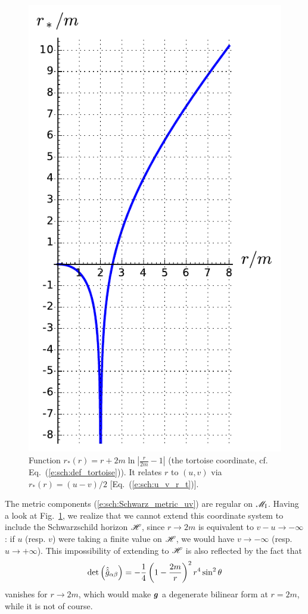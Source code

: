 \begin{figure}
\centerline{\includegraphics[height=0.4\textheight]{max_tortoise.pdf}}
\caption[]{\label{f:sch:tortoise} \footnotesize
Function $r_*(r) = r + 2 m \ln \left| \frac{r}{2m} - 1 \right|$
(the tortoise coordinate, cf. Eq.~(\ref{e:sch:def_tortoise})).
It relates $r$ to $(u,v)$ via $r_*(r) = (u-v)/2$ [Eq.~(\ref{e:sch:u_v_r_t})].}
\end{figure}

The metric components (\ref{e:sch:Schwarz_metric_uv}) are regular on $\mathscr{M}_{\rm I}$.
Having a look at Fig.~\ref{f:sch:tortoise}, we realize that we cannot extend
this coordinate system to include the Schwarzschild horizon $\mathscr{H}$, since
$r\rightarrow 2m$ is equivalent to $v-u\rightarrow -\infty$: if $u$ (resp. $v$)
were taking a finite value on $\mathscr{H}$, we would have $v\rightarrow -\infty$
(resp. $u\rightarrow +\infty$). This impossibility of extending to $\mathscr{H}$
is also reflected by the fact that
\[
    \det \left( \hat{\hat{g}}_{\alpha\beta} \right) =
        - \frac{1}{4} \left( 1 - \frac{2 m}{r} \right) ^2 r^4 \sin^2\theta
\]
vanishes for $r\rightarrow 2m$, which would make $\bm{g}$ a degenerate bilinear
form at $r=2m$, while it is not of course.

